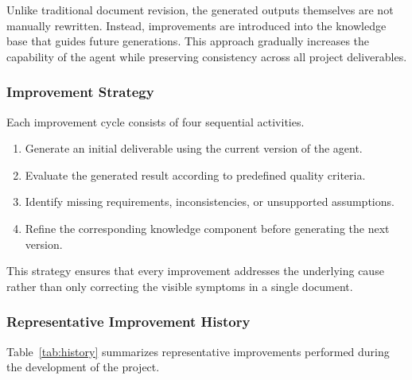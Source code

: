 Unlike traditional document revision, the generated outputs themselves are not manually rewritten. Instead, improvements are introduced into the knowledge base that guides future generations. This approach gradually increases the capability of the agent while preserving consistency across all project deliverables.

\subsubsection{Improvement Strategy}

Each improvement cycle consists of four sequential activities.

\begin{enumerate}

	\item Generate an initial deliverable using the current version of the agent.

	\item Evaluate the generated result according to predefined quality criteria.

	\item Identify missing requirements, inconsistencies, or unsupported assumptions.

	\item Refine the corresponding knowledge component before generating the next version.

\end{enumerate}

This strategy ensures that every improvement addresses the underlying cause rather than only correcting the visible symptoms in a single document.

\subsubsection{Representative Improvement History}

Table~\ref{tab:history} summarizes representative improvements performed during the development of the project.


